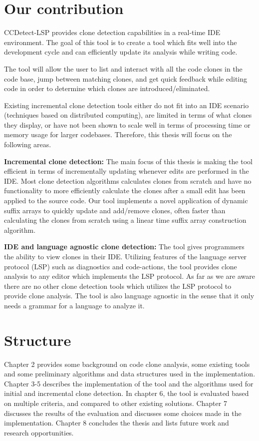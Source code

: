 \section{Our contribution}

CCDetect-LSP provides clone detection capabilities in a real-time IDE environment. The
goal of this tool is to create a tool which fits well into the development cycle and can
efficiently update its analysis while writing code. 

The tool will allow the user to list and interact with all the code clones in the
code base, jump between matching clones, and get quick feedback while editing code in order
to determine which clones are introduced/eliminated.

Existing incremental clone detection tools either do not fit into an IDE scenario
(techniques based on distributed computing), are limited in terms of what clones they
display, or have not been shown to scale well in terms of processing time or memory usage
for larger codebases. Therefore, this thesis will focus on the following areas.

\textbf{Incremental clone detection:} The main focus of this thesis is making the tool
efficient in terms of incrementally updating whenever edits are performed in the IDE. Most
clone detection algorithms calculates clones from scratch and have no functionality to
more efficiently calculate the clones after a small edit has been applied to the source
code. Our tool implements a novel application of dynamic suffix arrays to quickly update
and add/remove clones, often faster than calculating the clones from scratch using a
linear time suffix array construction algorithm.

\textbf{IDE and language agnostic clone detection:} The tool gives programmers the ability
to view clones in their IDE. Utilizing features of the language server protocol (LSP) such
as diagnostics and code-actions, the tool provides clone analysis to any editor which
implements the LSP protocol. As far as we are aware there are no other clone detection
tools which utilizes the LSP protocol to provide clone analysis. The tool is also language
agnostic in the sense that it only needs a grammar for a language to analyze it.

\section{Structure}

Chapter 2 provides some background on code clone analysis, some existing tools and some
preliminary algorithms and data structures used in the implementation. Chapter 3-5
describes the implementation of the tool and the algorithms used for initial and
incremental clone detection. In chapter 6, the tool is evaluated based on multiple
criteria, and compared to other existing solutions. Chapter 7 discusses the results of the
evaluation and discusses some choices made in the implementation. Chapter 8 concludes the
thesis and lists future work and research opportunities.
